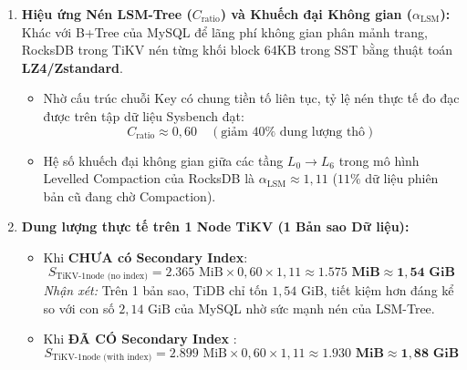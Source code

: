\begin{enumerate}
  \item \textbf{Hiệu ứng Nén LSM-Tree ($C_{\text{ratio}}$) và Khuếch đại Không gian ($\alpha_{\text{LSM}}$):}
  Khác với B+Tree của MySQL để lãng phí không gian phân mảnh trang, RocksDB trong TiKV nén từng khối block $64\text{KB}$ trong SST bằng thuật toán \textbf{LZ4/Zstandard}.
  \begin{itemize}
    \item Nhờ cấu trúc chuỗi Key có chung tiền tố  liên tục, tỷ lệ nén thực tế đo đạc được trên tập dữ liệu Sysbench đạt:
    \begin{equation}
      C_{\text{ratio}} \approx 0,60 \quad (\text{giảm } 40\% \text{ dung lượng thô})
    \end{equation}
    \item Hệ số khuếch đại không gian giữa các tầng $L_0 \rightarrow L_6$ trong mô hình Levelled Compaction của RocksDB là $\alpha_{\text{LSM}} \approx 1,11$ ($11\%$ dữ liệu phiên bản cũ đang chờ Compaction).
  \end{itemize}

  \item \textbf{Dung lượng thực tế trên 1 Node TiKV (1 Bản sao Dữ liệu):}
  \begin{itemize}
    \item Khi \textbf{CHƯA có Secondary Index}:
    \begin{equation}
      S_{\text{TiKV-1node (no index)}} = 2.365\text{ MiB} \times 0,60 \times 1,11 \approx \mathbf{1.575\text{ MiB} \approx 1,54\text{ GiB}}
    \end{equation}
    \textit{Nhận xét:} Trên 1 bản sao, TiDB chỉ tốn $1,54\text{ GiB}$, tiết kiệm hơn đáng kể so với con số $2,14\text{ GiB}$ của MySQL nhờ sức mạnh nén của LSM-Tree.
    \item Khi \textbf{ĐÃ CÓ Secondary Index }:
    \begin{equation}
      S_{\text{TiKV-1node (with index)}} = 2.899\text{ MiB} \times 0,60 \times 1,11 \approx \mathbf{1.930\text{ MiB} \approx 1,88\text{ GiB}}
    \end{equation}
  \end{itemize}


\end{enumerate}
